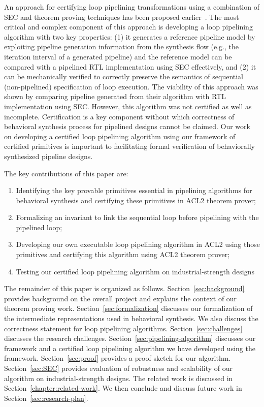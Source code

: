 An approach for certifying loop pipelining transformations using a combination of SEC and 
theorem proving techniques has been proposed earlier~\cite{hrx:dac-12}. The most critical and complex
component of this approach is developing
a loop pipelining algorithm with two key properties: (1) it generates a reference pipeline model 
by exploiting pipeline generation information from the synthesis flow (e.g., the iteration interval 
of a generated pipeline) and the reference model can be compared with a pipelined RTL 
implementation using SEC effectively, and (2) it can be mechanically verified to correctly preserve the semantics of
sequential (non-pipelined) specification of loop execution. The viability of 
this approach was shown by comparing pipeline generated from their algorithm with RTL implementation 
using SEC. However, this algorithm was not certified as well as incomplete. Certification is a key component 
without which correctness of behavioral synthesis process for pipelined designs cannot be claimed.
Our work on developing a certified loop pipelining algorithm using our framework of certified 
primitives is important to facilitating formal verification of behaviorally synthesized
 pipeline designs.

\medskip
The key contributions of this paper are:
\begin{enumerate}
\item Identifying the key provable primitives essential in pipelining algorithms for behavioral synthesis and certifying these primitives in ACL2 theorem prover;
\item Formalizing an invariant to link the sequential loop before pipelining with the pipelined loop;
\item Developing our own executable loop pipelining algorithm in ACL2 using those primitives and certifying this algorithm using ACL2 theorem prover;
\item Testing our certified loop pipelining algorithm on industrial-strength designs
\end{enumerate}

The remainder of this paper is organized as
follows. Section~\ref{sec:background} provides background on the overall project and 
explains the context of our theorem proving work. Section~\ref{sec:formalization} 
discusses our formalization of the intermediate representations used in behavioral synthesis.
We also discuss the correctness statement for loop pipelining algorithms. Section~\ref{sec:challenges} 
discusses the research challenges.
Section~\ref{sec:pipelining-algorithm} discusses our framework and a certified loop pipelining 
algorithm we have developed using the framework. Section~\ref{sec:proof} provides a proof 
sketch for our algorithm. Section~\ref{sec:SEC} provides evaluation of robustness and 
scalability of our algorithm on industrial-strength designs. The related work is discussed in Section~\ref{chapter:related-work}.
We then conclude and discuss future work in Section~\ref{sec:research-plan}.


